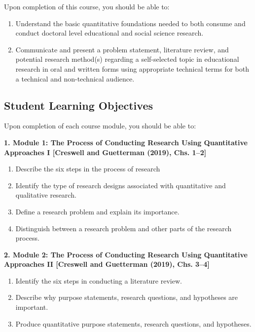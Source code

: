 \documentclass[
]{article}
\providecommand{\tightlist}{%
  \setlength{\itemsep}{0pt}\setlength{\parskip}{0pt}}
\begin{document}
Upon completion of this course, you should be able to:

\begin{enumerate}
\def\labelenumi{\arabic{enumi}.}
\tightlist
\item
  Understand the basic quantitative foundations needed to both consume
  and conduct doctoral level educational and social science research.
\item
  Communicate and present a problem statement, literature review, and
  potential research method(s) regarding a self-selected topic in
  educational research in oral and written forms using appropriate
  technical terms for both a technical and non-technical audience.
\end{enumerate}

\subsection{Student Learning Objectives}

Upon completion of each course module, you should be able to:

\textbf{1. Module 1: The Process of Conducting Research Using
Quantitative Approaches I {[}Creswell and Guetterman (2019), Chs.
1--2{]}}

\begin{enumerate}
\def\labelenumi{\arabic{enumi}.}
\tightlist
\item
  Describe the six steps in the process of research
\item
  Identify the type of research designs associated with quantitative and
  qualitative research.
\item
  Define a research problem and explain its importance.
\item
  Distinguish between a research problem and other parts of the research
  process.
\end{enumerate}

\textbf{2. Module 2: The Process of Conducting Research Using
Quantitative Approaches II {[}Creswell and Guetterman (2019), Chs.
3--4{]}}

\begin{enumerate}
\def\labelenumi{\arabic{enumi}.}
\tightlist
\item
  Identify the six steps in conducting a literature review.
\item
  Describe why purpose statements, research questions, and hypotheses
  are important.
\item
  Produce quantitative purpose statements, research questions, and
  hypotheses.
\end{enumerate}
\end{document}
